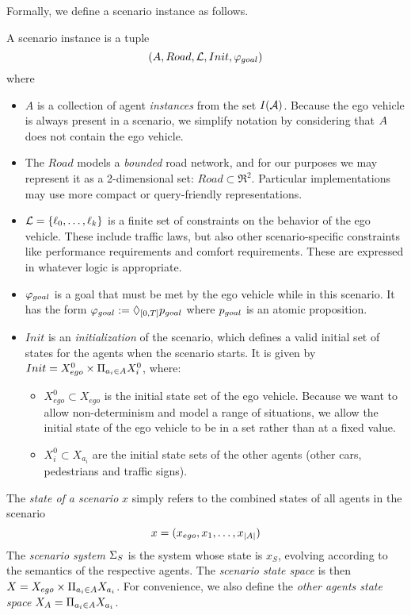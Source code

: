 Formally, we define a scenario instance as follows. 
\begin{defn}
	A scenario instance is a tuple 
	\[(A, Road,  \mathcal{L}, Init,  \varphi_{goal})\]
	 where
\begin{itemize}
	\item $A$ is a collection of agent \emph{instances} from the set $I(\mathcal{A})$.
	Because the ego vehicle is always present in a scenario, we simplify notation by considering that $A$ does not contain the ego vehicle.
	\item The $Road$ models a \emph{bounded} road network, and for our purposes we may represent it as a 2-dimensional set: $Road \subset \Re^2$.
	Particular implementations may use more compact or query-friendly representations.
	\item $\mathcal{L} = \{\ell_0,\ldots,\ell_k\}$ is a finite set of constraints on the behavior of the ego vehicle.
	These include traffic laws, but also other scenario-specific constraints like performance requirements and comfort requirements. These are expressed in whatever logic is appropriate.
	\item $\varphi_{goal}$ is a goal that must be met by the ego vehicle while in this scenario. 
	It has the form $\varphi_{goal} := \Diamond_{[0,T]} p_{goal}$ where $p_{goal}$ is an atomic proposition.
	\item $Init$ is an \emph{initialization} of the scenario, which defines a valid initial set of states for the agents when the scenario starts. 
	It is given by $Init = X_{ego}^0 \times \Pi_{a_i \in A} X_{i}^0$, where:
	\begin{itemize}
		\item $X_{ego}^0  \subset X_{ego}$ is the initial state set of the ego vehicle. Because we want to allow non-determinism and model a range of situations, we allow the initial state of the ego vehicle to be in a set rather than at a fixed value.
		\item $X_i^0  \subset X_{a_i}$ are the initial state sets of the other agents (other cars, pedestrians and traffic signs).
	\end{itemize}
\end{itemize}
The \emph{state of a scenario} $x$ simply refers to the combined states of all agents in the scenario
	\[x = (x_{ego}, x_1,\ldots,x_{|A|})\]
The \emph{scenario system} $\Sigma_S$ is the system whose state is $x_S$, evolving according to the semantics of the respective agents.
The \emph{scenario state space} is then $X = X_{ego} \times \Pi_{a_i \in A} X_{a_i}$.
For convenience, we also define the \emph{other agents state space} $X_A = \Pi_{a_i \in A} X_{a_i}$.
\end{defn}

